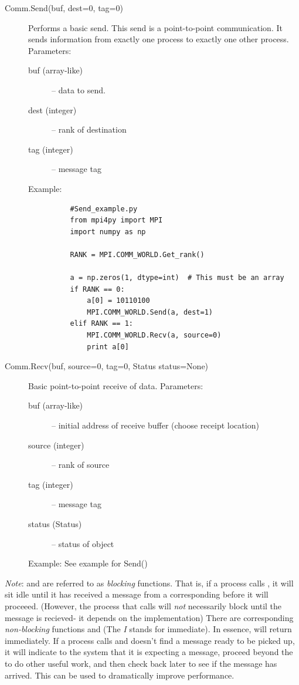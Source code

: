   \begin{description}
    \item[Comm.Send(buf, dest=0, tag=0)]
      Performs a basic send. This send is a point-to-point communication. It sends information from exactly one process to exactly one other process.
      Parameters:
      \begin{description}
        \item[buf (array-like)] – data to send.
            

        \item[dest (integer)] – rank of destination
        \item[tag (integer)] – message tag
      \end{description}
      Example:
        \begin{lstlisting}
          #Send_example.py
          from mpi4py import MPI
          import numpy as np

          RANK = MPI.COMM_WORLD.Get_rank()

          a = np.zeros(1, dtype=int)  # This must be an array
          if RANK == 0:
              a[0] = 10110100
              MPI.COMM_WORLD.Send(a, dest=1)
          elif RANK == 1:
              MPI.COMM_WORLD.Recv(a, source=0)
              print a[0]
        \end{lstlisting} 
    \item[Comm.Recv(buf, source=0, tag=0, Status status=None)]
      Basic point-to-point receive of data.
      Parameters:
      \begin{description}
        \item[buf (array-like)] – initial address of receive buffer (choose receipt location)
        \item[source (integer)] – rank of source
        \item[tag (integer)] – message tag
        \item[status (Status)] – status of object
      \end{description}
      Example:
        See example for Send()
  \end{description}



  \emph{Note}:
   and  are referred to as \emph{blocking} functions. That is, if a process calls , it will sit idle until it has received a message from a corresponding  before it will proceeed. (However, the process that calls  will \emph{not} necessarily block until the message is recieved- it depends on the implementation) There are corresponding \emph{non-blocking} functions  and  (The \emph{I} stands for immediate). In essence,  will return immediately. If a process calls  and doesn't find a message ready to be picked up, it will indicate to the system that it is expecting a message, proceed beyond the  to do other useful work, and then check back later to see if the message has arrived. This can be used to dramatically improve performance.
  
